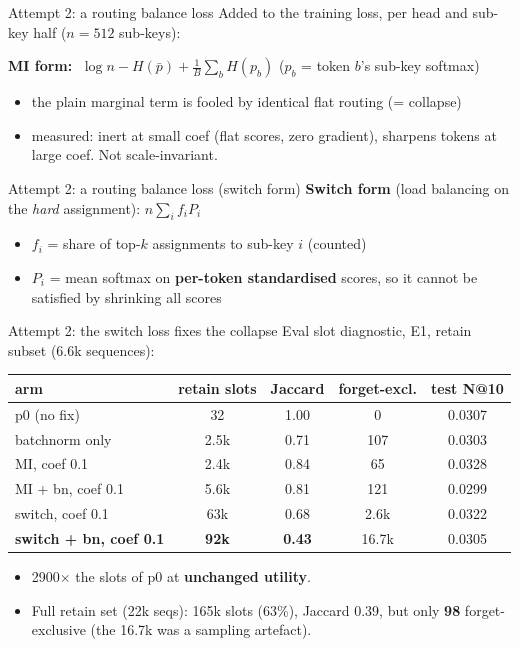 \documentclass{beamer}
\begin{document}
\begin{frame}{Attempt 2: a routing balance loss}
Added to the training loss, per head and sub-key half ($n{=}512$ sub-keys):

\medskip
\textbf{MI form:} $\;\log n - H(\bar p) + \tfrac1B\sum_b H(p_b)$
\quad ($p_b$ = token $b$'s sub-key softmax)
\begin{itemize}
  \item the plain marginal term is fooled by identical flat routing (= collapse)
  \item measured: \alert{inert} at small coef (flat scores, zero gradient),
        \alert{sharpens tokens} at large coef. Not scale-invariant.
\end{itemize}
\end{frame}

\begin{frame}{Attempt 2: a routing balance loss (switch form)}
\textbf{Switch form} (load balancing on the \emph{hard} assignment):
\;$n\sum_i f_i P_i$
\begin{itemize}
  \item $f_i$ = share of top-$k$ assignments to sub-key $i$ (counted)
  \item $P_i$ = mean softmax on \textbf{per-token standardised} scores, so it
        cannot be satisfied by shrinking all scores
\end{itemize}
\end{frame}

\begin{frame}{Attempt 2: the switch loss fixes the collapse}
Eval slot diagnostic, E1, retain subset (6.6k sequences):
\begin{center}
\small
\begin{tabular}{|l|c|c|c|c|}
\hline
arm & retain slots & Jaccard & forget-excl. & test N@10 \\
\hline
p0 (no fix)              & \alert{32} & 1.00 & 0 & 0.0307 \\
batchnorm only           & 2.5k  & 0.71 & 107  & 0.0303 \\
MI, coef 0.1             & 2.4k  & 0.84 & 65   & 0.0328 \\
MI + bn, coef 0.1        & 5.6k  & 0.81 & 121  & 0.0299 \\
switch, coef 0.1         & 63k   & 0.68 & 2.6k & 0.0322 \\
\textbf{switch + bn, coef 0.1} & \textbf{92k} & \textbf{0.43} & 16.7k & 0.0305 \\
\hline
\end{tabular}
\end{center}

\begin{itemize}
  \item 2900$\times$ the slots of p0 at \textbf{unchanged utility}.
  \item \alert{Full retain set (22k seqs):} 165k slots (63\%), Jaccard 0.39, but
        only \textbf{98} forget-exclusive (the 16.7k was a sampling artefact).
\end{itemize}
\end{frame}
\end{document}
